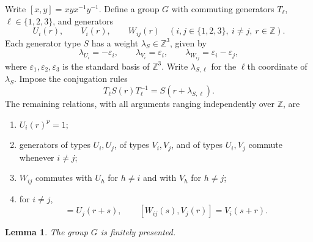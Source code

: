 \documentclass[11pt]{article}
\numberwithin{equation}{section}
\newtheorem{lemma}[theorem]{Lemma}
\theoremstyle{definition}
\theoremstyle{remark}
\newcommand{\Z}{\mathbb Z}
\begin{document}
Write $[x,y]=xyx^{-1}y^{-1}$. Define a group $G$ with commuting
generators $T_\ell$, $\ell\in\{1,2,3\}$, and generators
\[
  U_i(r),\qquad V_i(r),\qquad W_{ij}(r)
  \quad(i,j\in\{1,2,3\},\ i\neq j,\ r\in\Z).
\]
Each generator type $S$ has a weight $\lambda_S\in\Z^3$, given by
\begin{equation}
  \lambda_{U_i}=-\varepsilon_i,\qquad
  \lambda_{V_i}=\varepsilon_i,\qquad
  \lambda_{W_{ij}}=\varepsilon_i-\varepsilon_j,
  \label{eq:group-weights}
\end{equation}
where $\varepsilon_1,\varepsilon_2,\varepsilon_3$ is the standard basis
of $\Z^3$. Write $\lambda_{S,\ell}$ for the $\ell$th coordinate
of $\lambda_S$. Impose the conjugation rules
\begin{equation}
  T_\ell S(r)T_\ell^{-1}=S(r+\lambda_{S,\ell}).
  \label{eq:group-conjugation}
\end{equation}
The remaining relations, with all arguments ranging independently
over $\Z$, are
\begin{enumerate}
  \item $U_i(r)^p=1$;
  \item generators of types $U_i,U_j$, of types $V_i,V_j$, and of
    types $U_i,V_j$ commute whenever $i\neq j$;
  \item $W_{ij}$ commutes with $U_h$ for $h\neq i$ and with $V_h$
    for $h\neq j$;
  \item for $i\neq j$,
  \begin{equation}
    [U_i(r),W_{ij}(s)]=U_j(r+s),\qquad
    [W_{ij}(s),V_j(r)]=V_i(s+r).
    \label{eq:group-commutator-relations}
  \end{equation}
\end{enumerate}

\begin{lemma}
\label{lem:group-finite-presentation}
The group $G$ is finitely presented.
\end{lemma}
\end{document}
